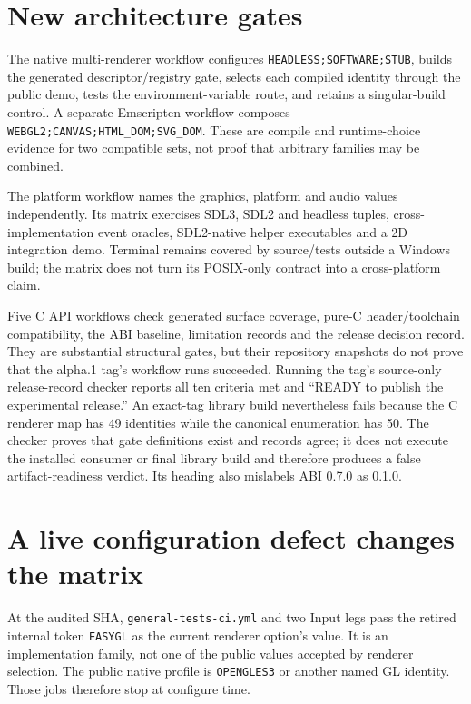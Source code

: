 \section{New architecture gates}

The native multi-renderer workflow configures \texttt{HEADLESS;SOFTWARE;STUB}, builds the
generated descriptor/registry gate, selects each compiled identity through the public demo, tests
the environment-variable route, and retains a singular-build control.  A separate Emscripten
workflow composes \texttt{WEBGL2;CANVAS;HTML\_DOM;SVG\_DOM}.  These are compile and runtime-choice
evidence for two compatible sets, not proof that arbitrary families may be combined.

The platform workflow names the graphics, platform and audio values independently.  Its matrix
exercises SDL3, SDL2 and headless tuples, cross-implementation event oracles, SDL2-native helper
executables and a 2D integration demo.  Terminal remains covered by source/tests outside a
Windows build; the matrix does not turn its POSIX-only contract into a cross-platform claim.

Five C API workflows check generated surface coverage, pure-C header/toolchain compatibility,
the ABI baseline, limitation records and the release decision record.  They are substantial
structural gates, but their repository snapshots do not prove that the alpha.1 tag's workflow
runs succeeded.  Running the tag's source-only release-record checker reports all ten criteria
met and ``READY to publish the experimental release.''  An exact-tag library build nevertheless
fails because the C renderer map has 49 identities while the canonical enumeration has 50. The
checker proves that gate definitions exist and records agree; it does not execute the installed
consumer or final library build and therefore produces a false artifact-readiness verdict. Its
heading also mislabels ABI 0.7.0 as 0.1.0.

\section{A live configuration defect changes the matrix}

At the audited SHA, \texttt{general-tests-ci.yml} and two Input legs pass the retired internal
token \texttt{EASYGL} as the current renderer option's value.  It is an implementation family,
not one of the \RendererIdentityCount{} public values accepted by renderer selection.  The public native profile is
\texttt{OPENGLES3} or another named GL identity.  Those jobs therefore stop at configure time.

